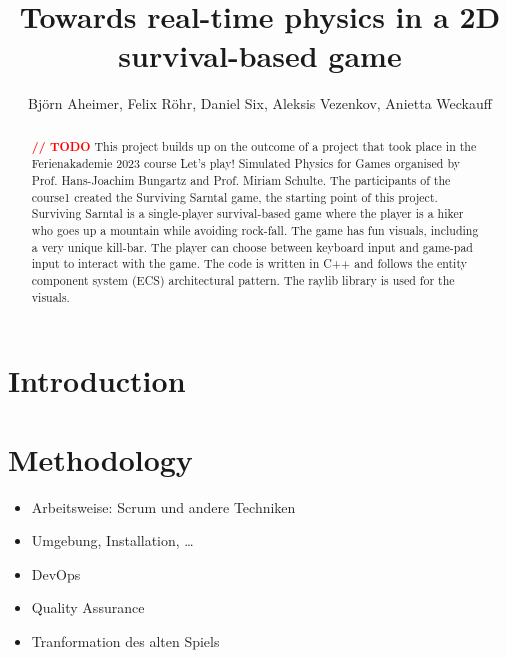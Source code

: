 \documentclass[a4paper,12pt]{llncs}
\numberwithin{equation}{section}
\begin{document}

%
\author{Bj\"orn Aheimer, Felix R\"ohr, Daniel Six, Aleksis Vezenkov, Anietta Weckauff}
%
\title{Towards real-time physics in a 2D survival-based game}
%
%
\maketitle              %
\thispagestyle{empty}
%
%
\begin{abstract}
  \textcolor{red}{\textbf{// TODO}}
  This project builds up on the outcome of a project that took place in the Ferienakademie 2023
  course \glqq{}Let's play! Simulated Physics for Games\grqq{} organised by Prof. Hans-Joachim Bungartz and
  Prof. Miriam Schulte. The participants of the course1 created the \glqq Surviving Sarntal\grqq{} game, the
  starting point of this project.
  \glqq Surviving Sarntal\grqq{} is a single-player survival-based game where the player is a hiker who goes
  up a mountain while avoiding rock-fall. The game has fun visuals, including a very unique kill-bar.
  The player can choose between keyboard input and game-pad input to interact with the game.
  The code is written in C++ and follows the entity component system (ECS) architectural pattern.
  The raylib library is used for the visuals.
\end{abstract}
%
\section{Introduction}

%
%
\section{Methodology}
\begin{itemize}
  \item Arbeitsweise: Scrum und andere Techniken
  \item Umgebung, Installation, \dots
  \item DevOps
  \item Quality Assurance
  \item Tranformation des alten Spiels
\end{itemize}
\end{document}
